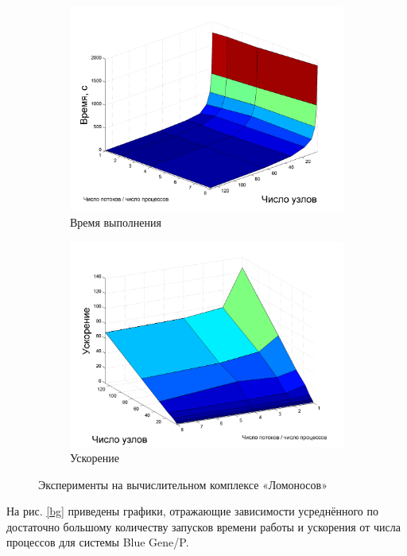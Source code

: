 \documentclass[a4paper,12pt]{report}
\begin{document}
	\begin{figure}[H]
			\begin{subfigure}{0.5\textwidth}
				\includegraphics[width=\textwidth]{hyb_lom.png}
				\caption{Время выполнения}
			\end{subfigure}
			\begin{subfigure}{0.5\textwidth}
				\includegraphics[width=\textwidth]{hyb_lom_speedup.png}
				\caption{Ускорение}
			\end{subfigure}
			\caption{Эксперименты на вычислительном комплексе «Ломоносов»}
			\label{lom}
		\end{figure}\par
	\par На рис. \ref{bg} приведены графики, отражающие зависимости усреднённого по достаточно большому количеству запусков времени работы и ускорения от числа процессов для системы Blue Gene/P.
	
\end{document}

